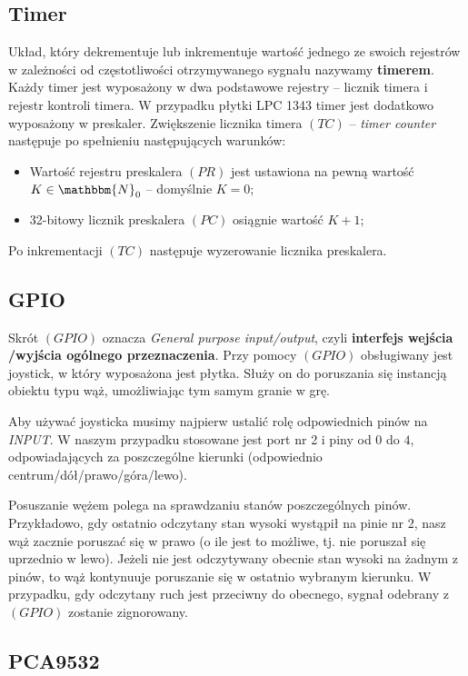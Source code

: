 \documentclass[a4paper,12pt,twoside]{article}
\newcommand{\N}{\mathbbm{N}}
\theoremstyle{plain}
\theoremstyle{definition}
\theoremstyle{remark}
\begin{document}
\subsection{Timer}
Układ, który dekrementuje lub inkrementuje wartość jednego ze swoich rejestrów w zależności od częstotliwości otrzymywanego sygnału nazywamy \textbf{timerem}. Każdy timer jest wyposażony w dwa podstawowe rejestry -- licznik timera i rejestr kontroli timera. W przypadku płytki LPC 1343 timer jest dodatkowo wyposażony w preskaler. Zwiększenie licznika timera $(TC)$ -- \textit{timer counter} następuje po spełnieniu następujących warunków:
\begin{itemize}
\item Wartość rejestru preskalera $(PR)$ jest ustawiona na pewną wartość $K\in \N_0$ -- domyślnie $K=0$;
\item 32-bitowy licznik preskalera $(PC)$ osiągnie wartość $K+1$;
\end{itemize}
Po inkrementacji $(TC)$ następuje wyzerowanie licznika preskalera.
\subsection{GPIO}
Skrót $(GPIO)$ oznacza \textit{General purpose input/output}, czyli \textbf{interfejs wejścia /wyjścia ogólnego przeznaczenia}. Przy pomocy $(GPIO)$ obsługiwany jest joystick, w który wyposażona jest płytka. Służy on do poruszania się instancją obiektu typu wąż, umożliwiając tym samym granie w grę.

Aby używać joysticka musimy najpierw ustalić rolę odpowiednich pinów na \textit{INPUT}. W naszym przypadku stosowane jest port nr 2 i piny od $0$ do $4$, odpowiadających za poszczególne kierunki (odpowiednio centrum/dół/prawo/góra/lewo). 

Posuszanie wężem polega na sprawdzaniu stanów poszczególnych pinów. Przykładowo, gdy ostatnio odczytany stan wysoki wystąpił na pinie nr 2, nasz wąż zacznie poruszać się w prawo (o ile jest to możliwe, tj. nie poruszał się uprzednio w lewo). Jeżeli nie jest odczytywany obecnie stan wysoki na żadnym z pinów, to wąż kontynuuje poruszanie się w ostatnio wybranym kierunku. W przypadku, gdy odczytany ruch jest przeciwny do obecnego, sygnał odebrany z $(GPIO)$ zostanie zignorowany.




\subsection{PCA9532}
\end{document}
